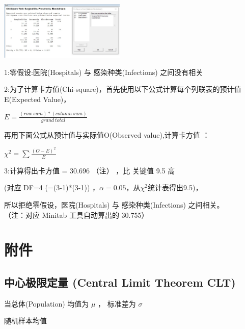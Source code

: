 \includegraphics[width=6cm]{6chiSquareTstResultScreenshot_2022-07-24_103606.jpg}

1:零假设:医院(Hospitals) 与 感染种类(Infections) 之间没有相关

2:为了计算卡方值(Chi-square)，首先使用以下公式计算每个列联表的预计值E(Expected
Value)，

\(E = \frac{(row \ sum) * (column \ sum)} {grand \ total}\)

再用下面公式从预计值与实际值O(Observed value),计算卡方值 ：

\(\chi ^2 = \sum \frac{(O - E)^2} {E}\)

3:计算得出卡方值 = 30.696 （注） ，比 关键值 9.5 高

\begin{description}
\tightlist
\item[]
(对应 DF=4 (=(3-1)*(3-1))
，\(\alpha = 0.05\)，从\(\chi ^2\)统计表得出9.5)，\\
\end{description}

所以拒绝零假设，医院(Hospitals) 与 感染种类(Infections) 之间相关。\\

（注：对应 Minitab 工具自动算出的 30.755）\\

\hypertarget{ux9644ux4ef6}{%
\section{附件}\label{ux9644ux4ef6}}

\hypertarget{ux4e2dux5fc3ux6781ux9650ux5b9aux91cf-central-limit-theorem-clt}{%
\subsection{中心极限定量 (Central Limit Theorem
CLT)}\label{ux4e2dux5fc3ux6781ux9650ux5b9aux91cf-central-limit-theorem-clt}}

当总体(Population) 均值为 \(\mu\) ， 标准差为 \(\sigma\)

\begin{description}
\tightlist
\item[]
随机样本均值
\end{description}

